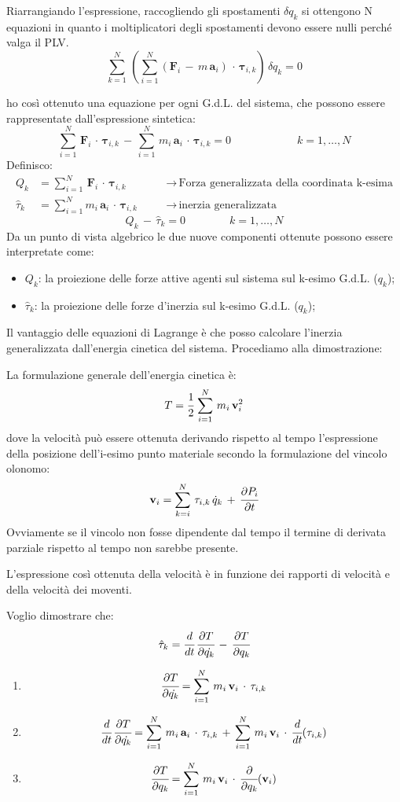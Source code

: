 Riarrangiando l'espressione, raccogliendo gli spostamenti $\delta q_k$ si ottengono N equazioni in quanto i moltiplicatori degli spostamenti devono essere nulli perché valga il PLV.
\[\sum_{k=1}^N\,(\sum_{i=1}^N (\mathbf{F}_i\,-\,m\,\mathbf{a}_i)\,\cdot\,\mathbf{\tau}_{i,k})\,\delta q_k = 0\]

ho così ottenuto una equazione per ogni G.d.L. del sistema, che possono essere rappresentate dall'espressione sintetica:
\[\sum_{i=1}^N\,\mathbf{F}_i\,\cdot\,\mathbf{\tau}_{i,k}\,-\,\sum_{i=1}^N\,m_i\,\mathbf{a}_i\,\cdot\,\mathbf{\tau}_{i,k} = 0\qquad\qquad\qquad  k = 1,\dots,N\]
Definisco:
\begin{align*}
Q_k &= \sum_{i=1}^N\,\mathbf{F}_i\,\cdot\,\mathbf{\tau}_{i,k}\quad&&\rightarrow\,\text{Forza generalizzata della coordinata k-esima}\\
\hat{\tau}_k &= \sum_{i=1}^N m_i\,\mathbf{a}_i\,\cdot\,\mathbf{\tau}_{i,k}\quad&&\rightarrow\,\text{inerzia generalizzata}
\end{align*}
\[Q_k\,-\,\hat{\tau}_k = 0\qquad\qquad k = 1,\dots,N\]
Da un punto di vista algebrico le due nuove componenti ottenute possono essere interpretate come:
\begin{itemize}
\item $Q_k$: la proiezione delle forze attive agenti sul sistema sul k-esimo G.d.L. ($q_k$);
\item $\hat{\tau}_k$: la proiezione delle forze d'inerzia sul k-esimo G.d.L. ($q_k$);
\end{itemize}

Il vantaggio delle equazioni di Lagrange è che posso calcolare l'inerzia generalizzata dall'energia cinetica del sistema. Procediamo alla dimostrazione:

La formulazione generale dell'energia cinetica è:
\[T = \cfrac{1}{2}\,\sum_{i=1}^N\,m_i\,\mathbf{v}_i^2\]
dove la velocità può essere ottenuta derivando rispetto al tempo l'espressione della posizione dell'i-esimo punto materiale secondo la formulazione del vincolo olonomo:
\[\mathbf{v}_i = \sum_{k=i}^N\,\mathbf{\tau}_{i,k}\,\dot{q}_k\,+\,\cfrac{\partial P_i}{\partial t}\]
Ovviamente se il vincolo non fosse dipendente dal tempo il termine di derivata parziale rispetto al tempo non sarebbe presente.

L'espressione così ottenuta della velocità è in funzione dei rapporti di velocità e della velocità dei moventi.

Voglio dimostrare che:
\[\hat{\tau}_k = \cfrac{d}{dt}\,\cfrac{\partial T}{\partial\dot{q_k}}\,-\,\cfrac{\partial T}{\partial q_k}\]
\begin{enumerate}
\item \[\cfrac{\partial T}{\partial\dot{q_k}} = \sum_{i=1}^N\,m_i\,\mathbf{v}_i\,\cdot\,\mathbf{\tau}_{i,k}\]
\item \[\cfrac{d}{dt}\,\cfrac{\partial T}{\partial\dot{q_k}} = \sum_{i=1}^N\,m_i\,\mathbf{a}_i\,\cdot\,\mathbf{\tau}_{i,k}\,+\,\sum_{i=1}^N\,m_i\,\mathbf{v}_i\,\cdot\,\cfrac{d}{dt}(\mathbf{\tau}_{i,k})\]
\item \[\cfrac{\partial T}{\partial q_k} = \sum_{i=1}^N\,m_i\,\mathbf{v}_i\,\cdot\,\cfrac{\partial}{\partial q_k}(\mathbf{v}_i)\]
\end{enumerate}

